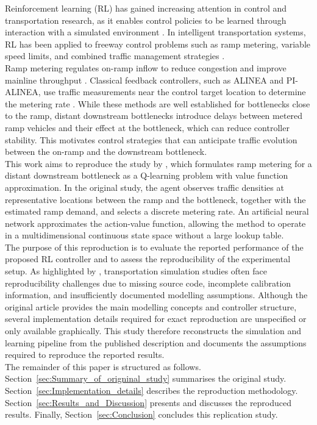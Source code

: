 Reinforcement learning (RL) \citep{RL_intro} has gained increasing attention in control and
transportation research, as it enables control policies to be learned through
interaction with a simulated environment \citep{EPSILON_GREEDY, busoniu2018reinforcement}.
In intelligent transportation systems, RL has been applied to freeway control
problems such as ramp metering, variable speed limits, and combined traffic
management strategies \citep{han2023leveraging}.\\
Ramp metering regulates on-ramp inflow to reduce congestion and improve
mainline throughput \citep{papageorgiou2002freeway}. Classical feedback
controllers, such as ALINEA and PI-ALINEA, use traffic measurements near the
control target location to determine the metering rate \citep{ALINEA, PI-ALINEA}.
While these methods are well established for bottlenecks close to the ramp,
distant downstream bottlenecks introduce delays between metered ramp vehicles
and their effect at the bottleneck, which can reduce controller stability. This motivates control strategies that can anticipate traffic
evolution between the on-ramp and the downstream bottleneck.\\
This work aims to reproduce the study by \cite{ORIGINAL_STUDY}, which formulates
ramp metering for a distant downstream bottleneck as a Q-learning problem with
value function approximation. In the original study, the agent observes traffic
densities at representative locations between the ramp and the bottleneck,
together with the estimated ramp demand, and selects a discrete metering rate.
An artificial neural network approximates the action-value function, allowing the
method to operate in a multidimensional continuous state space without a large
lookup table.\\
The purpose of this reproduction is to evaluate the reported performance of the
proposed RL controller and to assess the reproducibility of the experimental setup.
As highlighted by \cite{riehl2025revisiting}, transportation simulation studies
often face reproducibility challenges due to missing source code, incomplete
calibration information, and insufficiently documented modelling assumptions.
Although the original article provides the main modelling concepts and controller
structure, several implementation details required for exact reproduction are
unspecified or only available graphically. This study therefore reconstructs the
simulation and learning pipeline from the published description and documents
the assumptions required to reproduce the reported results.\\
The remainder of this paper is structured as follows. Section~\ref{sec:Summary_of_origninal_study}
summarises the original study. Section~\ref{sec:Implementation_details}
describes the reproduction methodology. Section~\ref{sec:Results_and_Discussion}
presents and discusses the reproduced results. Finally,
Section~\ref{sec:Conclusion} concludes this replication study.

